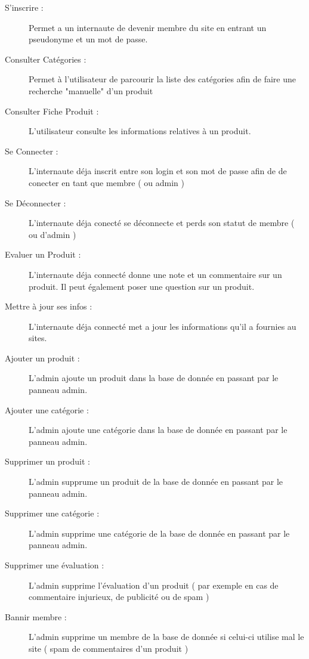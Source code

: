 \begin{description}
	\item[S'inscrire : ]	
		Permet a un internaute de devenir membre du site en entrant un pseudonyme et un mot de passe.
	\item[Consulter Catégories : ]	
		Permet à l'utilisateur de parcourir la liste des catégories afin de faire une recherche "manuelle" d'un produit
	\item[Consulter Fiche Produit : ]
		L'utilisateur consulte les informations relatives à un produit.
	\item[Se Connecter : ]
		L'internaute déja inscrit entre son login et son mot de passe afin de de conecter en tant que membre ( ou admin )
	\item[Se Déconnecter : ]	
		L'internaute déja conecté se déconnecte et perds son statut de membre ( ou d'admin )	
	\item[Evaluer un Produit : ]
		L'internaute déja connecté donne une note et un commentaire sur un produit. Il peut également poser une question sur un produit.
	\item[Mettre à jour ses infos : ]
		L'internaute déja connecté met a jour les informations qu'il a fournies au sites.
	\item[Ajouter un produit : ]
		L'admin ajoute un produit dans la base de donnée en passant par le panneau admin.	
	\item[Ajouter une catégorie : ]	
		L'admin ajoute une catégorie dans la base de donnée en passant par le panneau admin.	
	\item[Supprimer un produit : ]	
		L'admin supprume un produit de la base de donnée en passant par le panneau admin.
	\item[Supprimer une catégorie : ]
		L'admin supprime une catégorie de la base de donnée en passant par le panneau admin.
	\item[Supprimer une évaluation : ]	
		L'admin supprime l'évaluation d'un produit ( par exemple en cas de commentaire injurieux, de publicité ou de spam )	
	\item[Bannir membre : ]	
		L'admin supprime un membre de la base de donnée si celui-ci utilise mal le site ( spam de commentaires d'un produit )
\end{description}
